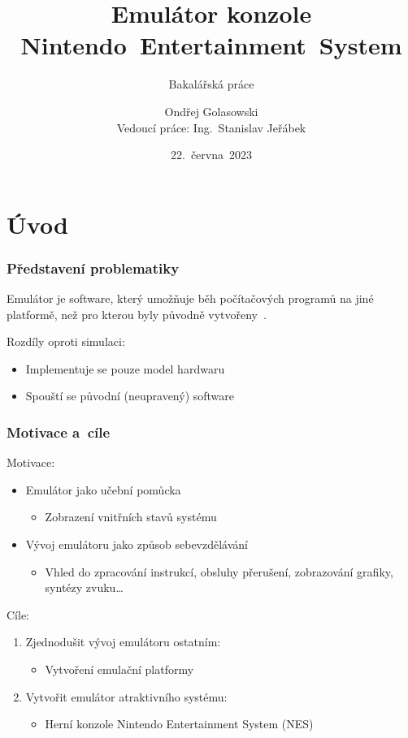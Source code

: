 \documentclass{beamer}
\title[Emulátor konzole NES]{Emulátor konzole Nintendo~Entertainment~System}
\subtitle{Bakalářská práce}
\author[Ondřej Golasowski]{Ondřej Golasowski\texorpdfstring{\\}{}Vedoucí práce: Ing.~Stanislav Jeřábek}
\institute[FIT ČVUT]{Katedra číslicového návrhu, FIT ČVUT}
\date{22.~června~2023}
\begin{document}
	
\begingroup
{}
\begin{frame}[noframenumbering]
	\titlepage
\end{frame}
\endgroup

\section{Úvod}
\begin{frame}
	\frametitle{Představení problematiky}
	\begin{definice}[Emulátor]
		Emulátor je software, který umožňuje běh počítačových programů na jiné platformě, než pro kterou byly původně vytvořeny~.
	\end{definice}
	Rozdíly oproti simulaci:
	\begin{itemize}
		\item Implementuje se pouze model hardwaru
		\item Spouští se původní (neupravený) software
	\end{itemize}
\end{frame}

\begin{frame}
	\frametitle{Motivace a~cíle}
	Motivace:
	\begin{itemize}
		\item Emulátor jako učební pomůcka
		\begin{itemize}
			\item Zobrazení vnitřních stavů systému
		\end{itemize}
		\item Vývoj emulátoru jako způsob sebevzdělávání
		\begin{itemize}
			\item Vhled do zpracování instrukcí, obsluhy přerušení, zobrazování grafiky, syntézy zvuku\dots
		\end{itemize}
	\end{itemize}
	Cíle:
	\begin{enumerate}
		\item Zjednodušit vývoj emulátoru ostatním:
		\begin{itemize}
			\item Vytvoření emulační platformy
		\end{itemize}
		\item Vytvořit emulátor atraktivního systému:
		\begin{itemize}
			\item Herní konzole Nintendo Entertainment System (NES)
		\end{itemize}
	\end{enumerate}
\end{frame}
\end{document}
